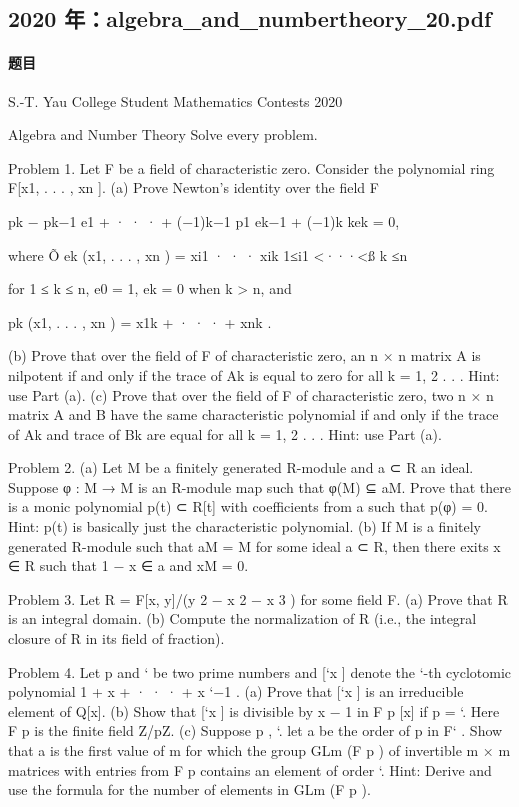 \documentclass[UTF8,12pt]{ctexart}
\begin{document}
\subsection{2020 年：algebra\_and\_numbertheory\_20.pdf}
\paragraph{题目}
S.-T. Yau College Student Mathematics Contests 2020

Algebra and Number Theory Solve every problem.

Problem 1. Let F be a field of characteristic zero. Consider the polynomial ring F[x1, . . . , xn ]. (a) Prove Newton’s identity over the field F

pk − pk−1 e1 + · · · + (−1)k−1 p1 ek−1 + (−1)k kek = 0,

where Õ ek (x1, . . . , xn ) = xi1 · · · xik 1≤i1 <···<ß k ≤n

for 1 ≤ k ≤ n, e0 = 1, ek = 0 when k > n, and

pk (x1, . . . , xn ) = x1k + · · · + xnk .

(b) Prove that over the field of F of characteristic zero, an n × n matrix A is nilpotent if and only if the trace of Ak is equal to zero for all k = 1, 2 . . . Hint: use Part (a). (c) Prove that over the field of F of characteristic zero, two n × n matrix A and B have the same characteristic polynomial if and only if the trace of Ak and trace of Bk are equal for all k = 1, 2 . . . Hint: use Part (a).

Problem 2. (a) Let M be a finitely generated R-module and a ⊂ R an ideal. Suppose φ : M → M is an R-module map such that φ(M) ⊆ aM. Prove that there is a monic polynomial p(t) ⊂ R[t] with coefficients from a such that p(φ) = 0. Hint: p(t) is basically just the characteristic polynomial. (b) If M is a finitely generated R-module such that aM = M for some ideal a ⊂ R, then there exits x ∈ R such that 1 − x ∈ a and xM = 0.

Problem 3. Let R = F[x, y]/(y 2 − x 2 − x 3 ) for some field F. (a) Prove that R is an integral domain. (b) Compute the normalization of R (i.e., the integral closure of R in its field of fraction).

Problem 4. Let p and ` be two prime numbers and [`x ] denote the `-th cyclotomic polynomial 1 + x + · · · + x `−1 . (a) Prove that [`x ] is an irreducible element of Q[x]. (b) Show that [`x ] is divisible by x − 1 in F p [x] if p = `. Here F p is the finite field Z/pZ. (c) Suppose p , `. let a be the order of p in F` . Show that a is the first value of m for which the group GLm (F p ) of invertible m × m matrices with entries from F p contains an element of order `. Hint: Derive and use the formula for the number of elements in GLm (F p ).
\end{document}
